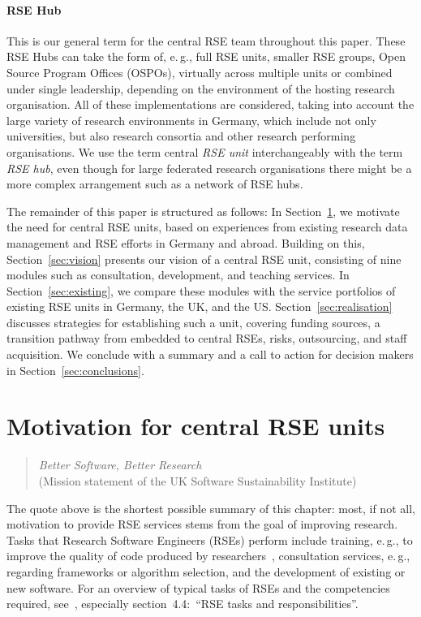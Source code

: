 \documentclass[a4paper]{article}
\newcommand*{\eg}{e.\,g.,\xspace}
\begin{document}
\paragraph{RSE Hub}
This is our general term for the central RSE team throughout this paper.
These RSE Hubs can take the form of, \eg{} full RSE units, smaller RSE groups, Open Source Program Offices (OSPOs), virtually across multiple units or combined under single leadership, depending on the environment of the hosting research organisation.
All of these implementations are considered, taking into account the large variety of research environments in Germany, which include not only universities, but also research consortia and other research performing organisations.
We use the term central \emph{RSE unit} interchangeably with the term \emph{RSE hub}, even though for large federated research organisations there might be a more complex arrangement such as a network of RSE hubs.

\medskip The remainder of this paper is structured as follows:
In Section~\ref{sec:motivation}, we motivate the need for central RSE units, based on experiences from existing research data management and RSE efforts in Germany and abroad.
Building on this, Section~\ref{sec:vision} presents our vision of a central RSE unit, consisting of nine modules such as consultation, development, and teaching services.
In Section~\ref{sec:existing}, we compare these modules with the service portfolios of existing RSE units in Germany, the UK, and the US.
Section~\ref{sec:realisation} discusses strategies for establishing such a unit, covering funding sources, a transition pathway from embedded to central RSEs, risks, outsourcing, and staff acquisition.
We conclude with a summary and a call to action for decision makers in Section~\ref{sec:conclusions}.

\section{Motivation for central RSE units}
\label{sec:motivation}
\begin{quotation}
      \noindent \textit{Better Software, Better Research}\\(Mission statement of the UK Software Sustainability Institute)
\end{quotation}

The quote above is the shortest possible summary of this chapter: most, if not all, motivation to provide RSE services stems from the goal of improving research.
Tasks that Research Software Engineers (RSEs) perform include training, \eg{} to improve the quality of code produced by researchers~\autocite{Ostlund2023}, consultation services, \eg{} regarding frameworks or algorithm selection, and the development of existing or new software.
For an overview of typical tasks of RSEs and the competencies required, see~\autocite{goth_foundational_competencies_2025}, especially section\ 4.4:\ “RSE tasks and responsibilities”.
\end{document}
